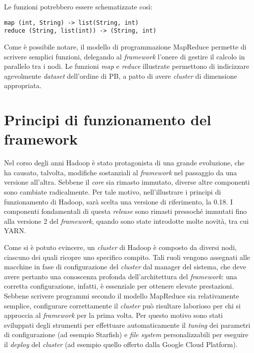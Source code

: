 Le funzioni potrebbero essere schematizzate così:

\begin{lstlisting}[frame=single]
map (int, String) -> list(String, int)
reduce (String, list(int)) -> (String, int)
\end{lstlisting}

Come è possibile notare, il modello di programmazione MapReduce permette di scrivere semplici funzioni, delegando al \textit{framework} l’onere di gestire il calcolo in parallelo tra 
i nodi. Le funzioni \textit{map} e \textit{reduce} illustrate permettono di indicizzare agevolmente \textit{dataset} dell’ordine di PB, a patto di avere \textit{cluster} di dimensione appropriata.


\section{Principi di funzionamento del framework}

Nel corso degli anni Hadoop è stato protagonista di una grande evoluzione, che ha causato, talvolta, modifiche sostanziali al \textit{framework} nel passaggio da una versione all’altra. 
Sebbene il \textit{core} sia rimasto immutato, diverse altre componenti sono cambiate radicalmente. Per tale motivo, nell’illustrare i principi di funzionamento di Hadoop, sarà scelta una 
versione di riferimento, la 0.18. I componenti fondamentali di questa \textit{release} sono rimasti pressoché immutati fino alla versione 2 del \textit{framework}, quando sono state introdotte molte 
novità, tra cui YARN. 

Come si è potuto evincere, un \textit{cluster} di Hadoop è composto da diversi nodi, ciascuno dei quali ricopre uno specifico compito. Tali ruoli vengono assegnati alle macchine in fase 
di configurazione del \textit{cluster} dal manager del sistema, che deve avere pertanto una conoscenza profonda dell’architettura del \textit{framework}: una corretta configurazione, infatti, è 
essenziale per ottenere elevate prestazioni. Sebbene scrivere programmi secondo il modello MapReduce sia relativamente semplice, configurare correttamente il \textit{cluster} può risultare 
laborioso per chi si approccia al \textit{framework} per la prima volta. Per questo motivo sono stati sviluppati degli strumenti per effettuare automaticamente il \textit{tuning} dei parametri di 
configurazione (ad esempio Starfish) e \textit{file system} personalizzabili per eseguire il \textit{deploy} del \textit{cluster} (ad esempio quello offerto dalla Google Cloud Platform).

